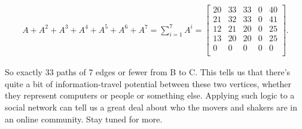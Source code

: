 \begin{alttitles}
\vspace{-.25in}
\begin{align*}
A + A^2 + A^3 + A^4 + A^5 + A^6 + A^7 = 
\sum_{i=1}^7 A^i = 
\begin{bmatrix}
20 & 33 & 33 &  0 & 40 \\
21 & 32 & 33 &  0 & 41 \\
12 & 21 & 20 &  0 & 25 \\
13 & 20 & 20 &  0 & 25 \\
 0 &  0 &  0 &  0 &  0 \\
\end{bmatrix}.
\end{align*}
\vspace{-.15in}

So exactly 33 paths of 7 edges or fewer from B to C. This tells us that there's
quite a bit of information-travel potential between these two vertices, whether
they represent computers or people or something else. Applying such logic to a
social network can tell us a great deal about who the movers and shakers are in
an online community. Stay tuned for more.



\end{alttitles}
